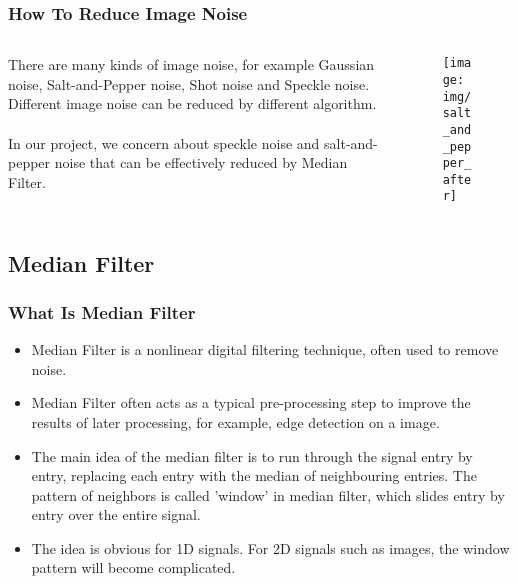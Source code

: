 \documentclass{beamer}
\begin{document}
\begin{frame}
\frametitle{How To Reduce Image Noise}
\begin{columns}
        \begin{column}{.5\textwidth}
		There are many kinds of image noise, for example Gaussian noise, Salt-and-Pepper noise, Shot noise and Speckle noise. Different image noise can be reduced by different algorithm.\\~\\
		In our project, we concern about speckle noise and salt-and-pepper noise that can be effectively reduced by Median Filter.
        \end{column}
        \begin{column}{.5\textwidth}%
		\begin{figure}
	           	\texttt{[image: img/salt\_and\_pepper\_after]}
		\end{figure}
        \end{column}
\end{columns}
\end{frame}

\subsection{Median Filter} 

\begin{frame}
\frametitle{What Is Median Filter}
\begin{itemize}
	\item Median Filter is a nonlinear digital filtering technique, often used to remove noise.
	\item Median Filter often acts as a typical pre-processing step to improve the results of later processing, for example, edge detection on a image.
	\item The main idea of the median filter is to run through the signal entry by entry, replacing each entry with the median of neighbouring entries. The pattern of neighbors is called 'window' in median filter, which slides entry by entry over the entire signal.
	\item The idea is obvious for 1D signals. For 2D signals such as images, the window pattern will become complicated. 
\end{itemize}
\end{frame}
\end{document}
